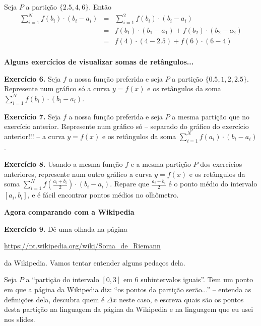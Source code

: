 \documentclass[oneside,12pt]{article}
\begin{document}
\msk

Seja $P$ a partição $\{2.5,4,6\}$. Então
%
$$\begin{array}{rcl}
  \sum_{i=1}^N f(b_i)·(b_i-a_i)
     &=& \sum_{i=1}^2 f(b_i)·(b_i-a_i) \\
     &=& f(b_1)·(b_1-a_1) + f(b_2)·(b_2-a_2) \\
     &=& f(4)·(4-2.5) + f(6)·(6-4) \\
  \end{array}
$$

\newpage


{\bf Alguns exercícios de visualizar somas de retângulos...}

\ssk

{\bf Exercício 6.} Seja $f$ a nossa função preferida e seja $P$ a
partição $\{0.5,1,2,2.5\}$. Represente num gráfico só a curva $y=f(x)$
e os retângulos da soma $\sum_{i=1}^N f(b_i)·(b_i-a_i)$.

\msk

{\bf Exercício 7.} Seja $f$ a nossa função preferida e seja $P$ a
mesma partição que no exercício anterior. Represente num gráfico só --
separado do gráfico do exercício anterior!!! -- a curva $y=f(x)$ e os
retângulos da soma $\sum_{i=1}^N f(a_i)·(b_i-a_i)$.

\msk

{\bf Exercício 8.} Usando a mesma função $f$ e a mesma partição $P$
dos exercícios anteriores, represente num outro gráfico a curva
$y=f(x)$ e os retângulos da soma $\sum_{i=1}^N
f(\frac{a_i+b_i}{2})·(b_i-a_i)$. Repare que $\frac{a_i+b_i}{2}$ é o
ponto médio do intervalo $[a_i,b_i]$, e é fácil encontrar pontos
médios no olhômetro.

\newpage

{\bf Agora comparando com a Wikipedia}

\msk

{\bf Exercício 9.} Dê uma olhada na página

\ssk

\url{https://pt.wikipedia.org/wiki/Soma_de_Riemann}

\ssk

da Wikipedia. Vamos tentar entender alguns pedaços dela.

Seja $P$ a ``partição do intervalo $[0,3]$ em 6 subintervalos
iguais''. Tem um ponto em que a página da Wikipedia diz: ``os pontos
da partição serão...'' -- entenda as definições dela, descubra quem é
$Δx$ neste caso, e escreva quais são os pontos desta partição na
linguagem da página da Wikipedia e na linguagem que eu usei nos slides.
\end{document}

